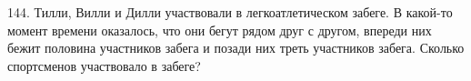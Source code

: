 144. Тилли, Вилли и Дилли участвовали в легкоатлетическом забеге. В какой-то момент времени оказалось, что они бегут рядом друг с другом, впереди них бежит половина участников забега и позади них треть участников забега. Сколько спортсменов участвовало в забеге?\\
